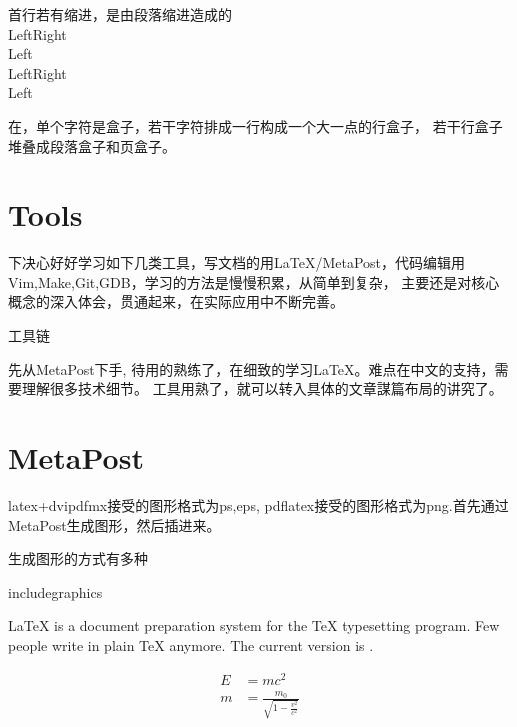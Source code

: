首行若有缩进，是由段落缩进造成的\\
Left\hrulefill Right\\
Left\hrulefill\\
Left\dotfill Right\\
Left\dotfill\\
\begin{minipage}{12cm}{在，单个字符是盒子，若干字符排成一行构成一个大一点的行盒子，
若干行盒子堆叠成段落盒子和页盒子。}
\end{minipage}

\newpage
\section{Tools}
下决心好好学习如下几类工具，写文档的用\LaTeX/MetaPost，代码编辑用Vim,Make,Git,GDB，学习的方法是慢慢积累，从简单到复杂，
主要还是对核心概念的深入体会，贯通起来，在实际应用中不断完善。

工具链

先从MetaPost下手, 待用的熟练了，在细致的学习\LaTeX。难点在中文的支持，需要理解很多技术细节。 工具用熟了，就可以转入具体的文章謀篇布局的讲究了。

\newpage
\section{MetaPost}
latex+dvipdfmx接受的图形格式为ps,eps, pdflatex接受的图形格式为png.首先通过MetaPost生成图形，然后插进来。

生成图形的方式有多种

includegraphics

\LaTeX{} is a document preparation system for the \TeX{} typesetting program. 
Few people write in plain \TeX{} anymore. The current version is \LaTeXe.

\begin{align}
  E &= mc^2\\
  m &= \frac{m_0}{\sqrt{1-\frac{v^2}{c^2}}}
\end{align}

